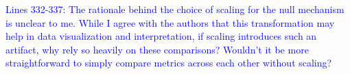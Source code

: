 \documentclass[
]{article}
\begin{document}



\textcolor{blue}{Lines 332-337: The rationale behind the choice of scaling for the null mechanism is unclear to me.
While I agree with the authors that this transformation may help in data visualization and interpretation, if scaling introduces such an artifact, why rely so heavily on these comparisons? Wouldn't it be more straightforward to simply compare metrics across each other without scaling?}
\end{document}
